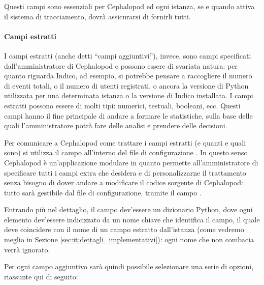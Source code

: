            Questi campi sono essenziali per Cephalopod ed ogni istanza, se e quando attiva il sistema di tracciamento, dovrà assicurarsi di fornirli tutti.
            
            \paragraph{Campi estratti}I campi estratti (anche detti ``campi aggiuntivi''), invece, sono campi specificati dall'amministratore di Cephalopod e possono essere di svariata natura: per quanto riguarda Indico, ad esempio, si potrebbe pensare a raccogliere il numero di eventi totali, o il numero di utenti registrati, o ancora la versione di Python utilizzata per una determinata istanza o la versione di Indico installata. I campi estratti possono essere di molti tipi: numerici, testuali, booleani, ecc. Questi campi hanno il fine principale di andare a formare le statistiche, sulla base delle quali l'amministratore potrà fare delle analisi e prendere delle decisioni.
            
            Per comunicare a Cephalopod come trattare i campi estratti (e quanti e quali sono) si utilizza il campo  all'interno del file di configurazione . In questo senso Cephalopod è un'applicazione modulare in quanto permette all'amministratore di specificare tutti i campi extra che desidera e di personalizzarne il trattamento senza bisogno di dover andare a modificare il codice sorgente di Cephalopod: tutto sarà gestibile dal file di configurazione, tramite il campo .
            
            Entrando più nel dettaglio, il campo  dev'essere un dizionario Python, dove ogni elemento dev'essere indicizzato da un nome chiave che identifica il campo, il quale deve coincidere con il nome di un campo estratto dall'istanza (come vedremo meglio in Sezione \ref{sec:it;dettagli_implementativi}): ogni nome che non combacia verrà ignorato.
            
            Per ogni campo aggiuntivo sarà quindi possibile selezionare una serie di opzioni, riassunte qui di seguito:
            
